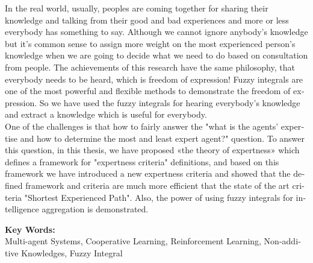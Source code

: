 \begin{latin}
\begin{small}
\bgroup
\baselineskip=0.6cm
In the real world, usually, peoples are coming together for sharing their knowledge and talking from their good and bad experiences and more or less everybody has something to say. Although we cannot ignore anybody's knowledge but it's common sense to assign more weight on the most experienced person's knowledge when we are going to decide what we need to do based on consultation from people. The achievements of this research have the same philosophy, that everybody needs to be heard, which is freedom of expression! Fuzzy integrals are one of the most powerful and flexible methods to demonstrate the freedom of expression. So we have used the fuzzy integrals for hearing everybody's knowledge and extract a knowledge which is useful for everybody.\\
\indent One of the challenges is that how to fairly answer the "what is the agents' expertise and how to determine the most and least expert agent?" question. To answer this question, in this thesis, we have proposed «the theory of expertness» which defines a framework for "expertness criteria" definitions, and based on this framework we have introduced a new expertness criteria and showed that the defined framework and criteria are much more efficient that the state of the art criteria "Shortest Experienced Path". Also, the power of using fuzzy integrals for intelligence aggregation is demonstrated.
\egroup
\end{small}

\vspace{0.5 cm}

\noindent \textbf{Key Words:}\\ Multi-agent Systems, Cooperative Learning, Reinforcement Learning, Non-additive Knowledges, Fuzzy Integral 

\end{latin}